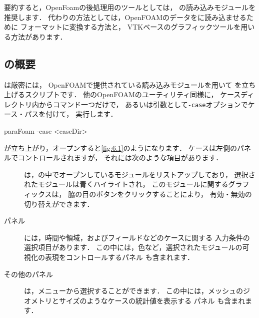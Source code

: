 要約すると，OpenFoamの後処理用のツールとしては，
の読み込みモジュールを推奨します．
代わりの方法としては，OpenFOAMのデータをに読み込ませるために
フォーマットに変換する方法と，
VTKベースのグラフィックツールを用いる方法があります．


\subsection{の概要}
\label{ssec:6.1.1}
は厳密には，
OpenFOAMで提供されている読み込みモジュールを用いて
を立ち上げるスクリプトです．
他のOpenFOAMのユーティリティ同様に，
ケースディレクトリ内からコマンド一つだけで，
あるいは引数として\texttt{-case}オプションでケース・パスを付けて，
実行します．
\begin{OFverbatim}[terminal]
paraFoam -case <caseDir>
\end{OFverbatim}
が立ち上がり，オープンすると\autoref{fig:6.1}のようになります．
ケースは左側のパネルでコントロールされますが，
それには次のような項目があります．
\begin{description}
 \item[]
%
%
            は，の中でオープンしているモジュールをリストアップしており，
            選択されたモジュールは青くハイライトされ，
            このモジュールに関するグラフィックスは，
            脇の目のボタンをクリックすることにより，
            有効・無効の切り替えができます．
 \item[パネル]
%
%
            には，時間や領域，およびフィールドなどのケースに関する
            入力条件の選択項目があります．
            この中には，色など，選択されたモジュールの可視化の表現をコントロールするパネル
%
%
            も含まれます．
 \item[その他のパネル]
            は，メニューから選択することができます．
            この中には，メッシュのジオメトリとサイズのようなケースの統計値を表示する
            パネル
%
%
            も含まれます．
\end{description}


